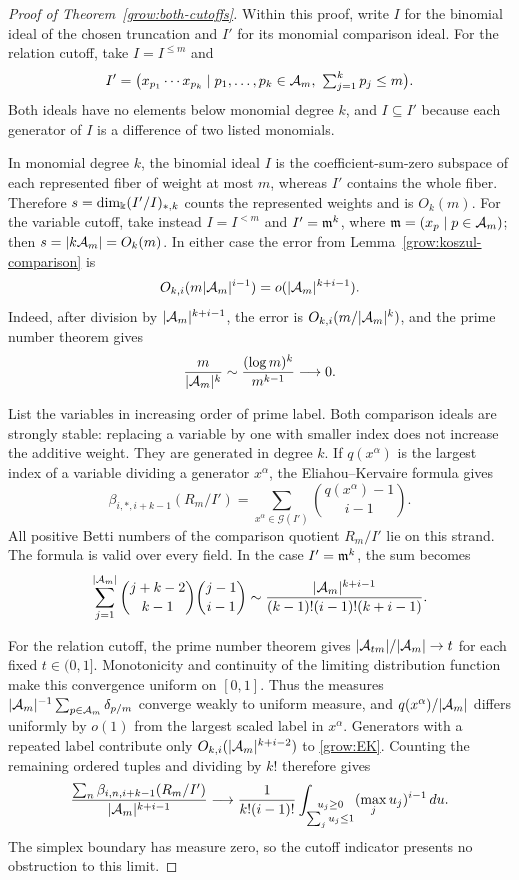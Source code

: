 \begin{proof}[Proof of Theorem~\ref{grow:both-cutoffs}]
Within this proof, write $I$ for the binomial ideal of the chosen
truncation and $I'$ for its monomial comparison ideal. For the relation
cutoff, take $I=I^{\le m}$ and
\[
 I'=\bigl(x_{p_1}\cdots x_{p_k}\mid p_1,\ldots,p_k\in\mathcal A_m,
       \ \textstyle\sum_{j=1}^k p_j\le m\bigr).
\]
Both ideals have no elements below monomial degree $k$, and
$I\subseteq I'$ because each generator of $I$ is a difference of two
listed monomials.

In monomial degree $k$, the binomial ideal $I$ is the coefficient-sum-zero
subspace of each represented fiber of weight at most $m$, whereas $I'$
contains the whole fiber. Therefore $s=\dim_\Bbbk(I'/I)_{*,k}$ counts the
represented weights and is $O_k(m)$. For the variable cutoff, take instead
$I=I^{<m}$ and $I'=\mathfrak m^k$, where $\mathfrak m=(x_p\mid p\in\mathcal A_m)$;
then $s=|k\mathcal A_m|=O_k(m)$. In either case the error from
Lemma~\ref{grow:koszul-comparison} is
\[
 O_{k,i}(m |\mathcal A_m|^{i-1})=o(|\mathcal A_m|^{k+i-1}).
\]
Indeed, after division by $|\mathcal A_m|^{k+i-1}$, the error is
$O_{k,i}(m/|\mathcal A_m|^k)$, and the prime number theorem gives
\[
 \frac{m}{|\mathcal A_m|^k}
 \sim\frac{(\log m)^k}{m^{k-1}}\longrightarrow0.
\]

List the variables in increasing order of prime label. Both comparison
ideals are strongly stable: replacing a variable by one with smaller
index does not increase the additive weight. They are generated in
degree $k$. If $q(x^\alpha)$ is the largest index of a variable dividing
a generator $x^\alpha$, the Eliahou--Kervaire formula \cite{EK90} gives
\begin{equation}\label{grow:EK}
 \beta_{i,*,i+k-1}(R_m/I')
 =\sum_{x^\alpha\in\mathcal G(I')}\binom{q(x^\alpha)-1}{i-1}.
\end{equation}
All positive Betti numbers of the comparison quotient $R_m/I'$ lie on
this strand. The formula is valid
over every field. In the case $I'=\mathfrak m^k$, the sum becomes
\[
 \sum_{j=1}^{|\mathcal A_m|}\binom{j+k-2}{k-1}\binom{j-1}{i-1}
 \sim\frac{|\mathcal A_m|^{k+i-1}}{(k-1)!(i-1)!(k+i-1)}.
\]

For the relation cutoff, the prime number theorem gives
$|\mathcal A_{tm}|/|\mathcal A_m|\to t$ for each fixed $t\in(0,1]$.
Monotonicity and continuity of the limiting distribution function make
this convergence uniform on $[0,1]$.
Thus the measures $|\mathcal A_m|^{-1}\sum_{p\in\mathcal A_m}\delta_{p/m}$ converge weakly
to uniform measure, and $q(x^\alpha)/|\mathcal A_m|$ differs uniformly by $o(1)$ from
the largest scaled label in $x^\alpha$. Generators with a repeated label
contribute only $O_{k,i}(|\mathcal A_m|^{k+i-2})$ to \eqref{grow:EK}. Counting the
remaining ordered tuples and dividing by $k!$ therefore gives
\begin{equation}\label{grow:simplex-moment}
 \frac{\sum_n\beta_{i,n,i+k-1}(R_m/I')}{|\mathcal A_m|^{k+i-1}}
 \longrightarrow\frac{1}{k!(i-1)!}
 \int_{\substack{u_j\ge0\\\sum_ju_j\le1}}
       (\max_j u_j)^{i-1}\,du.
\end{equation}
The simplex boundary has measure zero, so the cutoff indicator presents
no obstruction to this limit.


\end{proof}
